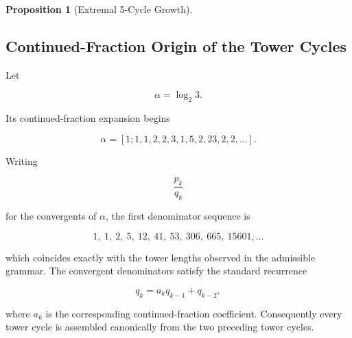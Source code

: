 \documentclass[12pt, oneside]{article}
\numberwithin{equation}{section}
\theoremstyle{definition}
\newtheorem{proposition}{Proposition}[section]
\theoremstyle{plain}
\theoremstyle{remark}
\begin{document}
\begin{proposition}[Extremal 5-Cycle Growth]

\subsection{Continued-Fraction Origin of the Tower Cycles}

Let

\[
\alpha=\log_2 3.
\]

Its continued-fraction expansion begins

\[
\alpha=[1;1,1,2,2,3,1,5,2,23,2,2,\dots].
\]

Writing

\[
\frac{p_k}{q_k}
\]

for the convergents of $\alpha$, the first denominator sequence is

\[
1,\ 1,\ 2,\ 5,\ 12,\ 41,\ 53,\ 306,\ 665,\ 15601,\ldots
\]

which coincides exactly with the tower lengths observed in the admissible grammar.
The convergent denominators satisfy the standard recurrence

\[
q_k=a_k q_{k-1}+q_{k-2},
\]

where $a_k$ is the corresponding continued-fraction coefficient.
Consequently every tower cycle is assembled canonically from the two
preceding tower cycles.


\end{proposition}
\end{document}

